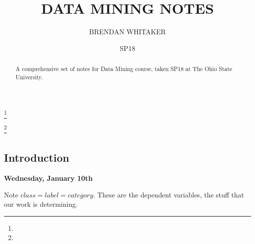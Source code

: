 \documentclass{amsbook}
\theoremstyle{plain}
\numberwithin{section}{chapter}
\numberwithin{equation}{chapter}
\theoremstyle{definition}
\theoremstyle{remark}
\begin{document}
\frontmatter

\title{DATA MINING NOTES}


\author{BRENDAN WHITAKER}
\address{}
\curraddr{}
\email{}
\thanks{}

\author{}
\address{}
\curraddr{}
\email{}
\thanks{}


\keywords{}

\date{SP18}

\begin{abstract}
A comprehensive set of notes for Data Mining course, taken SP18 at The Ohio State University. 
\end{abstract}

  \maketitle


\setcounter{page}{4}

\tableofcontents





\mainmatter

\setcounter{part}{0}
\part{}
\setcounter{chapter}{0}
\chapter{Introduction}

\textbf{Wednesday, January 10th}

Note $class = label = category$. These are the dependent variables, the stuff that our work is determining. 
\end{document}
